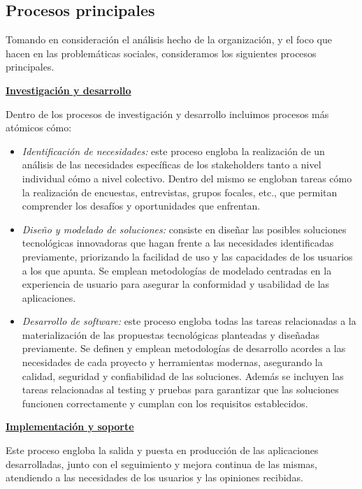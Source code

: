 \documentclass[a4paper,12pt]{article}
\begin{document}
    \subsection{Procesos principales}
    \par Tomando en consideración el análisis hecho de la organización, y el foco que hacen en las problemáticas sociales, consideramos los siguientes procesos principales.
    \newline
    \par \noindent \textbf{\underline{Investigación y desarrollo}} \newline
    \par Dentro de los procesos de investigación y desarrollo incluimos procesos más atómicos cómo:
    \begin{itemize}
        \item[] \textit{Identificación de necesidades:} este proceso engloba la realización de un análisis de las necesidades específicas de los stakeholders tanto a nivel individual cómo a nivel colectivo. Dentro del mismo se engloban tareas cómo la realización de encuestas, entrevistas, grupos focales, etc., que permitan comprender los desafíos y oportunidades que enfrentan.
        \item[] \textit{Diseño y modelado de soluciones:} consiste en diseñar las posibles soluciones tecnológicas innovadoras que hagan frente a las necesidades identificadas previamente, priorizando la facilidad de uso y las capacidades de los usuarios a los que apunta. Se emplean metodologías de modelado centradas en la experiencia de usuario para asegurar la conformidad y usabilidad de las aplicaciones.
        \item[] \textit{Desarrollo de software:} este proceso engloba todas las tareas relacionadas a la materialización de las propuestas tecnológicas planteadas y diseñadas previamente. Se definen y emplean metodologías de desarrollo acordes a las necesidades de cada proyecto y herramientas modernas, asegurando la calidad, seguridad y confiabilidad de las soluciones. Además se incluyen las tareas relacionadas al testing y pruebas para garantizar que las soluciones funcionen correctamente y cumplan con los requisitos establecidos.
    \end{itemize}
    \par \noindent \textbf{\underline{Implementación y soporte}}
    \newline
    \par Este proceso engloba la salida y puesta en producción de las aplicaciones desarrolladas, junto con el seguimiento y mejora continua de las mismas, atendiendo a las necesidades de los usuarios y las opiniones recibidas.
\end{document}
